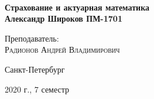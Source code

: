 \documentclass[aps,%
12pt,%
final,%
oneside,
onecolumn,%
musixtex, %
superscriptaddress,%
centertags]{article} %
\theoremstyle{plain}
\theoremstyle{definition}
\theoremstyle{remark}
\begin{document}
\begin{titlepage} 
\begin{center}
\textbf{}\\[10.0cm]
\textbf{\LARGE Страхование и актуарная математика}\\[0.5cm]
\textbf{\Large Александр Широков ПМ-1701} \\[0.2cm]


\begin{center} \large
{Преподаватель:} \\[0.5cm]
\textsc {Радионов Андрей Владимирович}\\
\end{center}

\vfill 



{\large {Санкт-Петербург}} \par
{\large {2020 г., 7 семестр}}
\end{center} 
\end{titlepage}

\begin{thebibliography}{3}
\end{thebibliography}
\tableofcontents
\newpage
\end{document}
